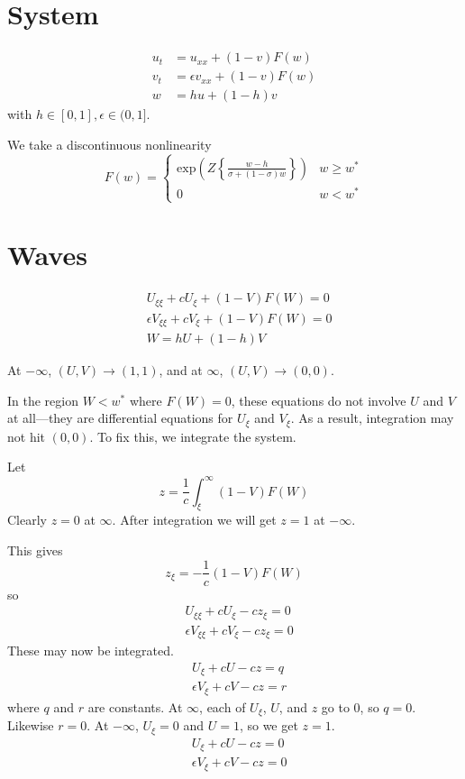 \documentclass[10pt]{article}
\begin{document}
\section{System}
\begin{align}
u_t &= u_{xx} + (1-v)F(w) \\
v_t &= \epsilon v_{xx} + (1-v)F(w)\\
w &= hu+(1-h)v
\end{align}
with $h \in [0,1], \epsilon \in (0,1]$.

We take a discontinuous nonlinearity
\begin{equation}
F(w) = \left\{\begin{array}{ll}
\mathrm{exp}\left(Z\left\{\frac{w-h}{\sigma+(1-\sigma)w} \right\} \right) & w \geq w^*\\
0 & w < w^*
\end{array} \right.
\end{equation}


\section{Waves}
\begin{align}
&U_{\xi\xi} + cU_\xi + (1-V)F(W) = 0\\
&\epsilon V_{\xi\xi} + cV_\xi + (1-V)F(W) = 0\\
&W = hU+(1-h)V
\end{align}

At $-\infty$, $(U,V) \to (1,1)$, and at $\infty$, $(U,V) \to (0,0)$.

In the region $W < w^*$ where $F(W) = 0$, these equations do not involve $U$ and $V$ at all---they are differential equations for $U_\xi$ and $V_\xi$.
As a result, integration may not hit $(0,0)$. To fix this, we integrate the system.

Let
\begin{equation}
z = \frac{1}{c}\int_\xi^\infty (1-V)F(W)
\end{equation}
Clearly $z=0$ at $\infty$.  After integration we will get $z=1$ at $-\infty$.

This gives
\begin{equation}
z_\xi = -\frac{1}{c}(1-V)F(W)
\end{equation}
so
\begin{align}
&U_{\xi\xi}+cU_\xi-cz_\xi = 0\\
&\epsilon V_{\xi\xi}+cV_\xi-cz_\xi = 0
\end{align}
These may now be integrated.
\begin{align}
&U_\xi + cU - cz = q \\
&\epsilon V_\xi + cV - cz = r
\end{align}
where $q$ and $r$ are constants.
At $\infty$, each of $U_\xi$, $U$, and $z$ go to 0, so $q=0$.
Likewise $r=0$.
At $-\infty$, $U_\xi = 0$ and $U = 1$, so we get $z=1$.
\begin{align}
&U_\xi + cU - cz = 0 \\
&\epsilon V_\xi + cV - cz = 0
\end{align}
\end{document}
